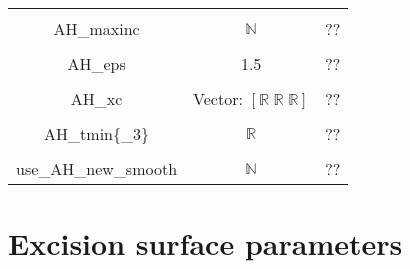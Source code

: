 \documentclass{article}
\begin{document}
\begin{table}[h]
\begin{tabular}{ccc}
      \\ \\
      AH\_maxinc 
      &
      $\mathbb{N}$
      &
      ??
      \\ \\
      AH\_eps 
      &
      1.5
      &
      ??
      \\ \\
      AH\_xc &
      Vector: $\left[ 
         \mathbb{R} \; \mathbb{R} \; \mathbb{R} 
      \right]$
      &
      ??
      \\ \\ 
      AH\_tmin\{\_3\} 
      &
      $\mathbb{R}$
      &
      ??
      \\ \\ 
      use\_AH\_new\_smooth
      &
      $\mathbb{N}$
      &
      ??
   \end{tabular}
\end{table}

\newpage
\section*{Excision surface parameters}
\end{document}
